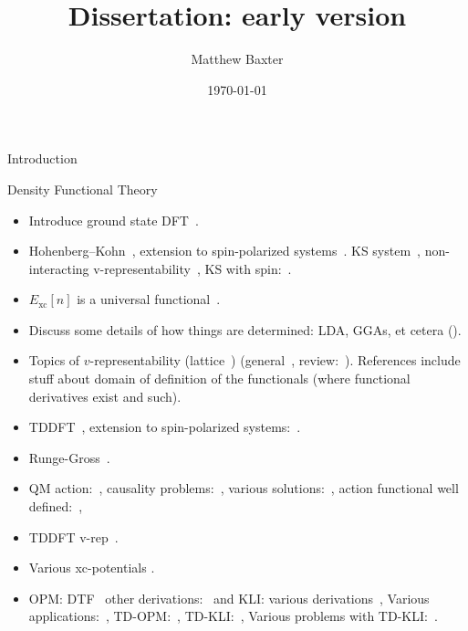 \documentclass[letterpaper, 11 pt]{article}
\title{Dissertation: early version}
\author{Matthew Baxter}
\date{\today}
\begin{document}
\maketitle

\begin{section}{Introduction \label{sec:intro}}

\end{section}

\begin{section}{Density Functional Theory \label{sec:dft}}

   \begin{itemize}

      \item Introduce ground state DFT~\cite[p. 61]{dft-engel}.

      \item Hohenberg–Kohn~\cite{hk-theorem}, extension to spin-polarized
         systems~\cite{spin-dep1, spin-dep2}. KS system~\cite{ks-eq}, non-interacting
         v-representability~\cite{nonint1, nonint2}, KS with spin:~\cite{spin-dep1, spin-dep3}.

      \item $E_\mathrm{xc}[n]$ is a universal functional~\cite{dft-engel}.

      \item Discuss some details of how things are determined: LDA, GGAs, et cetera
         ({\color{red}{still need this}}).

      \item Topics of $v$-representability (lattice~\cite{vrep-lat}) (general~\cite{vrep-levy1,
         vrep-levy2, vrep-lieb}, review:~\cite{vrep-rev}). References include stuff about domain of
         definition of the functionals (where functional derivatives exist and such).

      \item TDDFT~\cite{rgt, tddft, marques-1}, extension to spin-polarized systems:~\cite{td-spindep}.

      \item Runge-Gross~\cite{rgt}.

      \item QM action:~\cite{qmaction}, causality problems:~\cite{tddft-causality},
         various solutions:~\cite{caus-sol1, caus-sol2}, action functional well
         defined:~\cite{td-welldef}, 

      \item TDDFT v-rep~\cite{td-vrep}.

      \item Various xc-potentials {\color{red}{Add some refs?}}.

      \item OPM: DTF~\cite{opm1, opm2} other derivations:~\cite{opm3, opm4, opm5, opm-rev} and
         KLI: various derivations~\cite{kli1, kli2, kli3},
         Various applications:~\cite[p. 254]{dft-engel},
         TD-OPM:~\cite{tdopm}, TD-KLI:~\cite{tdkli1, tdkli2, tdkli3}, Various problems with
         TD-KLI:~\cite[p. 134-135]{tddft}.

   \end{itemize}

\end{section}
\end{document}
